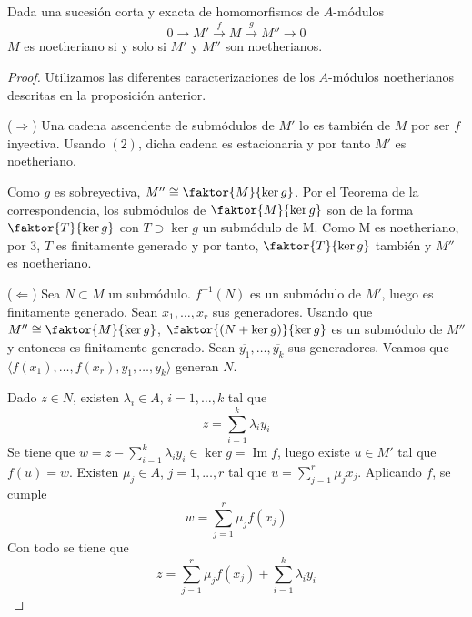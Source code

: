 \documentclass[../main.tex]{subfiles}
\begin{document}
\begin{proposition}
Dada una sucesión corta y exacta de homomorfismos de $A$-módulos $$0\longrightarrow M'\overset{f}{\longrightarrow}M\overset{g}{\longrightarrow}M''\longrightarrow 0$$ $M$ es noetheriano si y solo si $M'$ y $M''$ son noetherianos.
\end{proposition}
\begin{proof} Utilizamos las diferentes caracterizaciones de los $A$-módulos noetherianos descritas en la proposición anterior.

($\Longrightarrow$) Una cadena ascendente de submódulos de $M'$ lo es también de $M$ por ser $f$ inyectiva. Usando $(2)$, dicha cadena es estacionaria y por tanto $M'$ es noetheriano.

Como $g$ es sobreyectiva, $M''\cong\faktor{M}{\operatorname{ker} g}$. Por el Teorema de la correspondencia, los submódulos de $\faktor{M}{\operatorname{ker} g}$ son de la forma $\faktor{T}{\operatorname{ker} g}$ con $T\supset \operatorname{ker} g$ un submódulo de M. Como M es noetheriano, por $3$, $T$ es finitamente generado y por tanto, $\faktor{T}{\operatorname{ker} g}$ también y $M''$ es noetheriano.

($\Longleftarrow$) Sea $N\subset M$ un submódulo. $f^{-1}(N)$ es un submódulo de $M'$, luego es finitamente generado. Sean $x_1,\dots,x_r$ sus generadores. Usando que $M''\cong\faktor{M}{\operatorname{ker} g}$, $\faktor{(N+\operatorname{ker} g)}{\operatorname{ker} g}$ es un submódulo de $M''$ y entonces es finitamente generado. Sean $\overline{y_1},\dots,\overline{y_k}$ sus generadores. Veamos que $\langle f(x_1),\dots,f(x_r),y_1,\dots,y_k\rangle$ generan $N$.

Dado $z\in N$, existen $\lambda_i\in A$, $i=1,\dots,k$ tal que $$\overline{z}=\sum_{i=1}^k\lambda_i\overline{y_i}$$ Se tiene que $w=z-\sum_{i=1}^k\lambda_iy_i\in\operatorname{ker} g=\operatorname{Im} f$, luego existe $u\in M'$ tal que $f(u)=w$. Existen $\mu_j\in A$, $j=1,\dots,r$ tal que $u=\sum_{j=1}^r\mu_jx_j$. Aplicando $f$, se cumple $$w=\sum_{j=1}^r\mu_jf(x_j)$$ Con todo se tiene que $$z=\sum_{j=1}^r\mu_jf(x_j)+\sum_{i=1}^k\lambda_iy_i$$
\end{proof}
\end{document}
